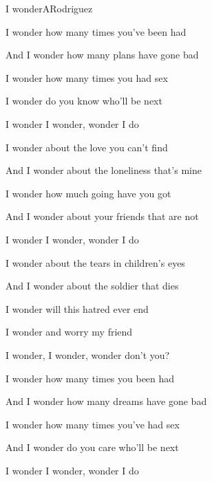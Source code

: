 \begin{song}{I wonder}{A}{Rodriguez}

\begin{SBVerse}

   

I wonder how many times you've been had

And I wonder how many plans have gone bad

I wonder how many times you had sex

I wonder do you know who'll be next

I wonder I wonder, wonder I do

\end{SBVerse}

\begin{SBVerse}

I wonder about the love you can't find

And I wonder about the loneliness that's mine

I wonder how much going have you got

And I wonder about your friends that are not

I wonder I wonder, wonder I do

\end{SBVerse}

\begin{SBVerse}

I wonder about the tears in children's eyes

And I wonder about the soldier that dies

I wonder will this hatred ever end

I wonder and worry my friend

I wonder, I wonder, wonder don't you?

\end{SBVerse}

\begin{SBVerse}

I wonder how many times you been had

And I wonder how many dreams have gone bad

I wonder how many times you've had sex

And I wonder do you care who'll be next

I wonder I wonder, wonder I do

\end{SBVerse}

\end{song}

\clearpage
